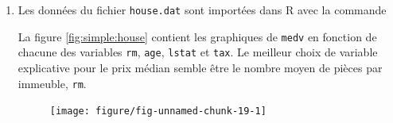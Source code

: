 \begin{solution}{2.17}
    \begin{enumerate}
    \item Les données du fichier \texttt{house.dat} sont importées
      dans \textsf{R} avec la commande
\begin{knitrout}
\color{fgcolor}\begin{kframe}
\begin{alltt}
 \hlkwb{<-} \hlstd{(}\hlstd{,}  \hlstd{=} \hlstd{)}
\end{alltt}
\end{kframe}
\end{knitrout}
      La figure \ref{fig:simple:house} contient les graphiques de
      \texttt{medv} en fonction de chacune des variables \texttt{rm},
      \texttt{age}, \texttt{lstat} et \texttt{tax}. Le meilleur choix
      de variable explicative pour le prix médian semble être le
      nombre moyen de pièces par immeuble, \texttt{rm}.
      \begin{figure}
        \centering
\begin{knitrout}
\color{fgcolor}\begin{kframe}
\begin{alltt}
\hlstd{(} \hlstd{=} \hlstd{(}\hlstd{,} \hlstd{))}
 \hlopt{~}  \hlopt{+}  \hlopt{+}  \hlopt{+}     \hlstd{=} \hlstd{)}
\end{alltt}
\end{kframe}

{\centering \texttt{[image: figure/fig-unnamed-chunk-19-1]}

}




\end{knitrout}
\end{figure}
\end{enumerate}
\end{solution}
